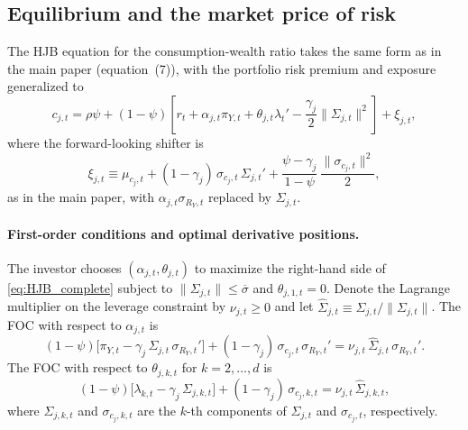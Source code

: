 \documentclass[11pt,english]{article}
\begin{document}
\subsection{Equilibrium and the market price of risk}\label{sec:eq_lambda}

The HJB equation for the consumption-wealth ratio takes the same form as in the main paper (equation~(7)), with the portfolio risk premium and exposure generalized to
\begin{equation}\label{eq:HJB_complete}
    c_{j,t} = \rho\psi + (1-\psi)\!\left[r_t + \alpha_{j,t}\pi_{Y,t} + \theta_{j,t}\lambda_t' - \frac{\gamma_j}{2}\|\Sigma_{j,t}\|^2\right] + \xi_{j,t},
\end{equation}
where the forward-looking shifter is
\begin{equation}\label{eq:xi_complete}
    \xi_{j,t} \equiv \mu_{c_j,t} + (1-\gamma_j)\,\sigma_{c_j,t}\,\Sigma_{j,t}' + \frac{\psi-\gamma_j}{1-\psi}\,\frac{\|\sigma_{c_j,t}\|^2}{2},
\end{equation}
as in the main paper, with $\alpha_{j,t}\sigma_{R_Y,t}$ replaced by $\Sigma_{j,t}$.

\paragraph{First-order conditions and optimal derivative positions.}
The investor chooses $(\alpha_{j,t},\theta_{j,t})$ to maximize the right-hand side of \eqref{eq:HJB_complete} subject to $\|\Sigma_{j,t}\|\le\overline{\sigma}$ and $\theta_{j,1,t}=0$. Denote the Lagrange multiplier on the leverage constraint by $\nu_{j,t}\ge 0$ and let $\widehat{\Sigma}_{j,t}\equiv\Sigma_{j,t}/\|\Sigma_{j,t}\|$. The FOC with respect to $\alpha_{j,t}$ is
\begin{equation}\label{eq:FOC_alpha_complete}
    (1-\psi)\Big[\pi_{Y,t} - \gamma_j\,\Sigma_{j,t}\,\sigma_{R_Y,t}'\Big] + (1-\gamma_j)\,\sigma_{c_j,t}\,\sigma_{R_Y,t}' = \nu_{j,t}\,\widehat{\Sigma}_{j,t}\,\sigma_{R_Y,t}'.
\end{equation}
The FOC with respect to $\theta_{j,k,t}$ for $k=2,\ldots,d$ is
\begin{equation}\label{eq:FOC_theta_complete}
    (1-\psi)\Big[\lambda_{k,t} - \gamma_j\,\Sigma_{j,k,t}\Big] + (1-\gamma_j)\,\sigma_{c_j,k,t} = \nu_{j,t}\,\widehat{\Sigma}_{j,k,t},
\end{equation}
where $\Sigma_{j,k,t}$ and $\sigma_{c_j,k,t}$ are the $k$-th components of $\Sigma_{j,t}$ and $\sigma_{c_j,t}$, respectively.
\end{document}
